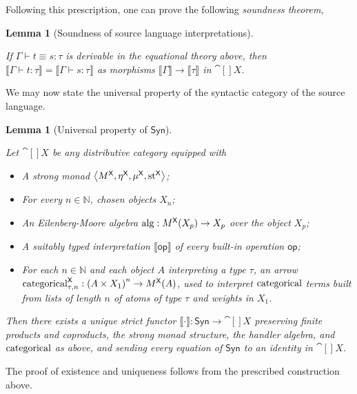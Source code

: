 \documentclass[11pt,a4paper]{article}
\newtheorem{lemma}[theorem]{Lemma}
\theoremstyle{definition}
\theoremstyle{remark}
\providecommand{\N}{\mathbb{N}}
\providecommand{\Syn}{\mathsf{Syn}}
\providecommand{\srcop}{\mathsf{op}}
\providecommand{\genint}[1]{\llbracket #1\rrbracket}
\providecommand{\categ}{\operatorname{categorical}}
\providecommand{\str}{\operatorname{st}}
\begin{document}
Following this prescription, one can prove the following \emph{soundness theorem},
\begin{lemma}[Soundness of source language interpretations]
  \label{lem:soundness-of-source-language-interpretations}

  If \( \Gamma \vdash t \equiv s : \tau \) is derivable in the equational theory above, then \( \genint{\Gamma \vdash t : \tau} = \genint{\Gamma \vdash s : \tau} \) as morphisms \( \genint{\Gamma} \to \genint{\tau} \) in \( \cat[]{X} \).
\end{lemma}


We may now state the universal property of the syntactic category of the source language.

\begin{lemma}[Universal property of \( \Syn \)]
  \label{lem:universal-property-of-the-syntactic-category-of-the-source-language}

  Let \( \cat[]{X} \) be any distributive category equipped with
  \begin{itemize}
  \item A strong monad \( \tuple{ M^{\cat[]{X}}, \eta^{\cat[]{X}}, \mu^{\cat[]{X}}, \str^{\cat[]{X}} } \);
  \item For every \( n \in \N \), chosen objects \( X_{n} \);
  \item An Eilenberg-Moore algebra \( \opn{alg}: \Fun[nn]{ M^{\cat[]{X}} }{ X_{p} } \to X_{p} \) over the object \( X_{p} \);
  \item A suitably typed interpretation \( \genint{\srcop} \) of every built-in operation \( \srcop \);
  \item For each \( n \in \N \) and each object \( A \) interpreting a type \( \tau \), an arrow \( \categ^{\cat[]{X}}_{\tau, n}: \left( A \times X_{1} \right)^{n} \to \Fun[nn]{ M^{\cat[]{X}} }{ A } \), used to interpret \( \opn[b]{categorical} \) terms built from lists of length \( n \) of atoms of type \( \tau \) and weights in \( X_{1} \).
  \end{itemize}

  Then there exists a unique strict functor \( \genint{ \cdot }: \Syn \to \cat[]{X} \) preserving finite products and coproducts, the strong monad structure, the handler algebra, and \( \opn[b]{categorical} \) as above, and sending every equation of \( \Syn \) to an identity in \( \cat[]{X} \).
\end{lemma}

The proof of existence and uniqueness follows from the prescribed construction above.
\end{document}
